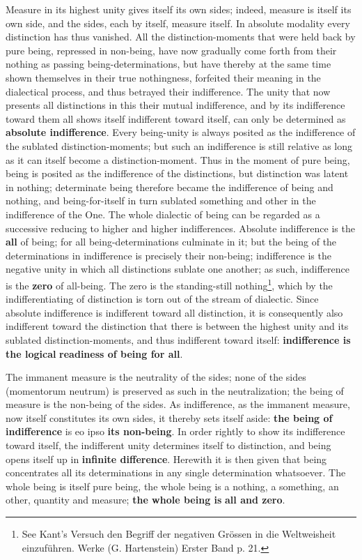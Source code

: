 \documentclass[12pt,a4paper,openany]{book}
\newcommand{\opage}[1]{\marginnote{\footnotesize\textit{[#1]}}}
\begin{document}
Measure in its highest unity gives itself its own sides; indeed, measure is itself its own side, and the sides, each by itself, measure itself. In absolute modality every distinction has thus vanished. All the distinction-moments that were held back by pure being, repressed in non-being, have now gradually come forth from their nothing as passing being-determinations, but have thereby at the same time shown themselves in their true nothingness, forfeited their meaning in the dialectical process, and thus betrayed their indifference. The unity that now presents all distinctions in this their mutual indifference, and by its indifference toward them all shows itself indifferent toward itself, can only be determined as \textbf{absolute indifference}.
\setcounter{footnote}{0}%
\opage{78}Every being-unity is always posited as the indifference of the sublated distinction-moments; but such an indifference is still relative as long as it can itself become a distinction-moment. Thus in the moment of pure being, being is posited as the indifference of the distinctions, but distinction was latent in nothing; determinate being therefore became the indifference of being and nothing, and being-for-itself in turn sublated something and other in the indifference of the One. The whole dialectic of being can be regarded as a successive reducing to higher and higher indifferences. Absolute indifference is the \textbf{all} of being; for all being-determinations culminate in it; but the being of the determinations in indifference is precisely their non-being; indifference is the negative unity in which all distinctions sublate one another; as such, indifference is the \textbf{zero} of all-being. The zero is the standing-still nothing\footnote{See Kant's Versuch den Begriff der negativen Grössen in die Weltweisheit einzuführen. Werke (G. Hartenstein) Erster Band p. 21.}, which by the indifferentiating of distinction is torn out of the stream of dialectic. Since absolute indifference is indifferent toward all distinction, it is consequently also indifferent toward the distinction that there is between the highest unity and its sublated distinction-moments, and thus indifferent toward itself: \textbf{indifference is the logical} \textbf{readiness of being for all}.

The immanent measure is the neutrality of the sides; none of the sides (momentorum neutrum) is preserved as such in the neutralization; the being of measure is the non-being of the sides. As indifference, as the immanent measure, now itself constitutes its own sides, it thereby sets itself aside: \textbf{the being of indifference} is eo ipso \textbf{its non-being}. In order rightly to show its indifference toward itself, the indifferent unity determines itself to distinction, and being opens itself up in \textbf{infinite difference}.
\setcounter{footnote}{0}%
\opage{79}Herewith it is then given that being concentrates all its determinations in any single determination whatsoever. The whole being is itself pure being, the whole being is a nothing, a something, an other, quantity and measure; \textbf{the whole being is} \textbf{all and zero}.
\end{document}
